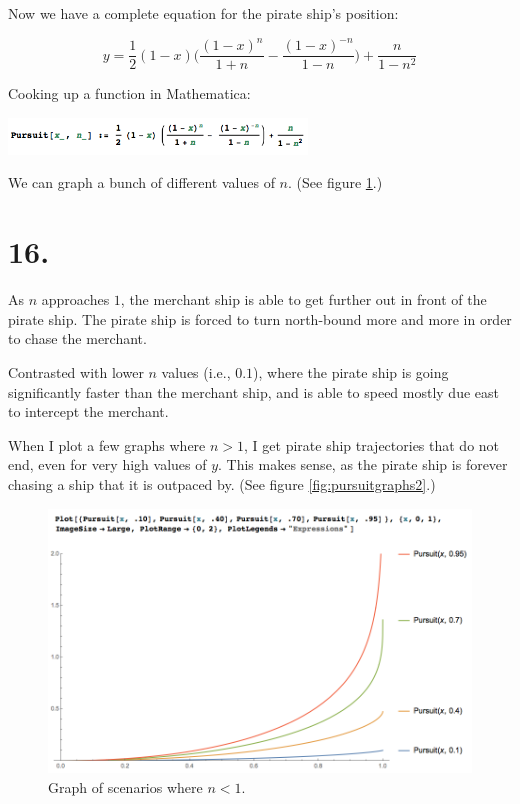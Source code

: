 \documentclass[11pt]{report}
\begin{document}
Now we have a complete equation for the pirate ship's position:

$$y = \frac{1}{2}(1-x)\Bigg(\frac{(1-x)^{n}}{1+n} - \frac{(1-x)^{-n}}{1-n}\Bigg) + \frac{n}{1-n^2} $$

Cooking up a function in Mathematica:

\includegraphics[width=300px]{pursuit-function}

We can graph a bunch of different values of $n$. (See figure \ref{fig:pursuitgraphs}.)

\section*{16.}

As $n$ approaches $1$, the merchant ship is able to get further out
in front of the pirate ship. The pirate ship is forced to turn north-bound more and more
in order to chase the merchant.

Contrasted with lower $n$ values (i.e., $0.1$), where the
pirate ship is going significantly faster than the merchant ship,
and is able to speed mostly due east to intercept the merchant.

When I plot a few graphs where $n>1$, I get pirate ship trajectories that
do not end, even for very high values of $y$.
This makes sense, as the pirate ship is forever chasing a ship that it
is outpaced by. (See figure \ref{fig:pursuitgraphs2}.)

\begin{figure}
\includegraphics[width=\linewidth]{pursuitgraphs}
\caption{Graph of scenarios where $n<1$.}
\label{fig:pursuitgraphs}
\end{figure}
\end{document}
